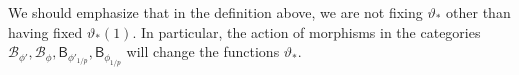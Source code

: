 We should emphasize that in the definition above, we are not fixing
$\vartheta_{*}$ other than having fixed $ \vartheta_*(1)$.  In
particular, the action of morphisms in the categories
$\mathscr{B}_{\phi'},\mathscr{B}_{\phi},\mathsf{B}_{\phi'_{1/p}},\mathsf{B}_{\phi_{1/p}}$
will change the functions $\vartheta_{*}$.


